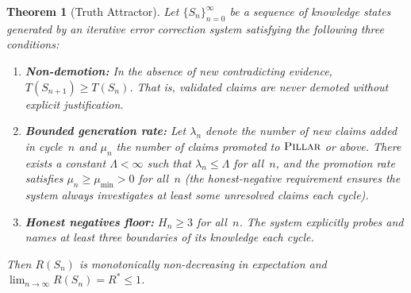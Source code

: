 \documentclass[11pt]{article}
\newtheorem{theorem}{Theorem}[section]
\theoremstyle{definition}
\theoremstyle{remark}
\newcommand{\PILLAR}{\textsc{Pillar}}
\begin{document}
\begin{theorem}[Truth Attractor]
\label{thm:truth-attractor}
Let $\{S_n\}_{n=0}^{\infty}$ be a sequence of knowledge states generated by
an iterative error correction system satisfying the following three conditions:
\begin{enumerate}
  \item[\textbf{C1.}] \textbf{Non-demotion:} In the absence of new
    contradicting evidence, $T(S_{n+1}) \geq T(S_n)$.  That is, validated
    claims are never demoted without explicit justification.
  \item[\textbf{C2.}] \textbf{Bounded generation rate:} Let $\lambda_n$ denote
    the number of new claims added in cycle~$n$ and $\mu_n$ the number of
    claims promoted to $\PILLAR$ or above.  There exists a constant
    $\Lambda < \infty$ such that $\lambda_n \leq \Lambda$ for all~$n$, and
    the promotion rate satisfies $\mu_n \geq \mu_{\min} > 0$ for all~$n$
    (the honest-negative requirement ensures the system always investigates
    at least some unresolved claims each cycle).
  \item[\textbf{C3.}] \textbf{Honest negatives floor:} $H_n \geq 3$ for
    all~$n$.  The system explicitly probes and names at least three
    boundaries of its knowledge each cycle.
\end{enumerate}
Then $R(S_n)$ is monotonically non-decreasing in expectation and
$\lim_{n \to \infty} R(S_n) = R^* \leq 1$.
\end{theorem}
\end{document}
